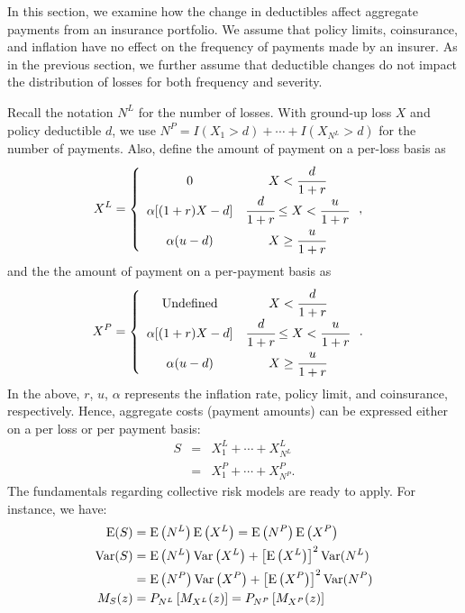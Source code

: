 \documentclass[12pt,letterpaper]{article}
\begin{document}
In this section, we examine how the change in deductibles affect aggregate payments from an insurance portfolio. We assume that policy limits, coinsurance, and inflation have no effect on the frequency of payments made by an insurer. As in the previous section, we further assume that deductible changes do not impact the distribution of losses for both frequency and severity.

Recall the notation $N^L$ for the number of losses. With ground-up loss $X$ and policy deductible $d$, we use
$N^P = I(X_1>d) + \cdots + I(X_{N^L}>d)$ for the number of payments.
Also, define the amount of payment on a per-loss basis as
\begin{eqnarray*}
    X^{L}&=\left\{
      \begin{array}{cc}
        0 & X<\cfrac{d}{1+r} \\
        \alpha[(1+r)X-d] & \cfrac{d}{1+r}\leq X<\cfrac{u}{1+r} \\
        \alpha(u-d) &  X \ge \cfrac{u}{1+r}\\
      \end{array}
\right.,
\end{eqnarray*}
and the the amount of payment on a per-payment basis as
\begin{eqnarray*}
    X^{P}&=\left\{
      \begin{array}{cc}
        {\rm Undefined} & X<\cfrac{d}{1+r} \\
        \alpha[(1+r)X-d] & \cfrac{d}{1+r}\leq X<\cfrac{u}{1+r} \\
        \alpha(u-d) &  X \ge \cfrac{u}{1+r}\\
      \end{array}
\right..
\end{eqnarray*}
In the above, $r$, $u$, $\alpha$ represents the inflation rate, policy limit, and coinsurance, respectively. Hence, aggregate costs (payment amounts) can be expressed either on a per loss or per
payment basis:
\begin{eqnarray*}
S &=& X^L_1 + \cdots + X^L_{N^L} \\
&=&X^P_1 + \cdots + X^P_{N^P} .
\end{eqnarray*}
The fundamentals regarding collective risk models are ready to apply. For instance, we have:
\begin{align*}
  {\rm E}(S) &= {\rm E}\left(N^L\right) {\rm E}\left(X^L\right) = {\rm E}\left(N^P\right) {\rm E}\left(X^P\right)\\
  {\rm Var}(S) &= {\rm E}\left(N^L\right) {\rm Var}\left(X^L\right) + \left[{\rm E}\left(X^L\right)\right]^2 {\rm Var}(N^L) \\
  &= {\rm E}\left(N^P\right) {\rm Var}\left(X^P\right) + \left[{\rm E}\left(X^P\right)\right]^2 {\rm Var}(N^P)\\
  M_S(z)&=P_{N^L}\left[M_{X^L}(z)\right]=P_{N^P}\left[M_{X^P}(z)\right]
\end{align*}
\end{document}
